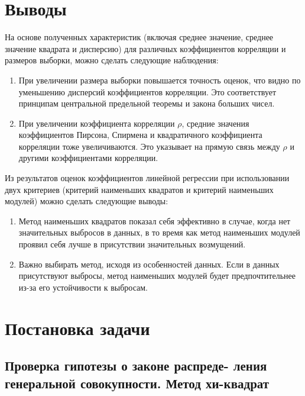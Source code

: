 \documentclass[12pt,a4paper]{article}
\begin{document}
	\clearpage

	\section{Выводы}

	На основе полученных характеристик (включая среднее значение, среднее
	значение квадрата и дисперсию) для различных коэффициентов корреляции и
	размеров выборки, можно сделать следующие наблюдения:

	\begin{enumerate}
		\item При увеличении размера выборки повышается точность оценок, что
		видно по уменьшению дисперсий коэффициентов корреляции. Это
		соответствует принципам центральной предельной теоремы и закона
		больших чисел.
		\item При увеличении коэффициента корреляции \( \rho \), средние
		значения коэффициентов Пирсона, Спирмена и квадратичного коэффициента
		корреляции тоже увеличиваются. Это указывает на прямую связь между
		\( \rho \) и другими коэффициентами корреляции.
	\end{enumerate}

	Из результатов оценок коэффициентов линейной регрессии при использовании
	двух критериев (критерий наименьших квадратов и критерий наименьших
	модулей) можно сделать следующие выводы:

	\begin{enumerate}
		\item Метод наименьших квадратов показал себя эффективно в случае,
		когда нет значительных выбросов в данных, в то время как метод
		наименьших модулей проявил себя лучше в присутствии значительных
		возмущений.
		\item Важно выбирать метод, исходя из особенностей данных. Если в
		данных присутствуют выбросы, метод наименьших модулей будет
		предпочтительнее из-за его устойчивости к выбросам.
	\end{enumerate}

	\section{Постановка задачи}

	\subsection{Проверка гипотезы о законе распреде- ления генеральной
		совокупности. Метод хи-квадрат}
\end{document}
